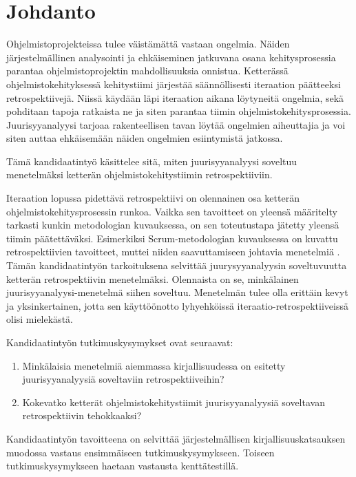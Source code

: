 
\section{Johdanto}

Ohjelmistoprojekteissa tulee väistämättä vastaan ongelmia. Näiden järjestelmällinen analysointi ja ehkäiseminen jatkuvana osana kehitysprosessia parantaa ohjelmistoprojektin mahdollisuuksia onnistua. Ketterässä ohjelmistokehityksessä kehitystiimi järjestää säännöllisesti iteraation päätteeksi retrospektiivejä. Niissä käydään läpi iteraation aikana löytyneitä ongelmia, sekä pohditaan tapoja ratkaista ne ja siten parantaa tiimin ohjelmistokehitysprosessia. Juurisyyanalyysi tarjoaa rakenteellisen tavan löytää ongelmien aiheuttajia ja voi siten auttaa ehkäisemään näiden ongelmien esiintymistä jatkossa.

Tämä kandidaatintyö käsittelee sitä, miten juurisyyanalyysi soveltuu menetelmäksi ketterän ohjelmistokehitystiimin retrospektiiviin.

Iteraation lopussa pidettävä retrospektiivi on olennainen osa ketterän ohjelmistokehitysprosessin runkoa. Vaikka sen tavoitteet on yleensä määritelty tarkasti kunkin metodologian kuvauksessa, on sen toteutustapa jätetty yleensä tiimin päätettäväksi. Esimerkiksi Scrum-metodologian kuvauksessa on kuvattu retrospektiivien tavoitteet, muttei niiden saavuttamiseen johtavia menetelmiä \citep{ScrumGuide2011}. Tämän kandidaatintyön tarkoituksena selvittää juurysyyanalyysin soveltuvuutta ketterän retrospektiivin menetelmäksi. Olennaista on se, minkälainen juurisyyanalyysi-menetelmä siihen soveltuu. Menetelmän tulee olla erittäin kevyt ja yksinkertainen, jotta sen käyttöönotto lyhyehköissä iteraatio-retrospektiiveissä olisi mielekästä.

Kandidaatintyön tutkimuskysymykset ovat seuraavat:
\begin{enumerate}
\item Minkälaisia menetelmiä aiemmassa kirjallisuudessa on esitetty juurisyyanalyysiä soveltaviin retrospektiiveihin?
\item Kokevatko ketterät ohjelmistokehitystiimit juurisyyanalyysiä soveltavan retrospektiivin tehokkaaksi?
\end{enumerate}

Kandidaatintyön tavoitteena on selvittää järjestelmällisen kirjallisuuskatsauksen \citep{Kitchenham2010} muodossa vastaus ensimmäiseen tutkimuskysymykseen. Toiseen tutkimuskysymykseen haetaan vastausta kenttätestillä.

